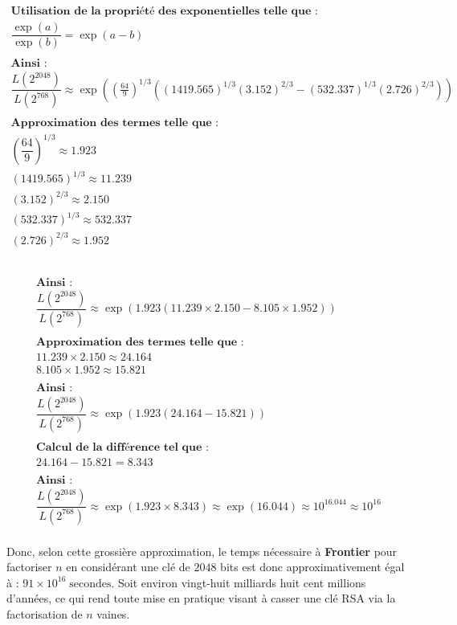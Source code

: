 \documentclass{article}
\begin{document}
\[\begin{array}{l}
	\textbf{Utilisation de la propriété des exponentielles telle que :}\\
	\dfrac{\exp(a)}{\exp(b)} = \exp(a-b) \\ \\
	\textbf{Ainsi :}\\
	\dfrac{L(2^{2048})}{L(2^{768})} \approx \exp\left(\left({\frac{64}{9}}\right)^{1/3} \left(\left(1419.565\right)^{1/3} \left(3.152\right)^{2/3} - \left(532.337\right)^{1/3} \left(2.726\right)^{2/3}\right)\right) \\ \\
	\textbf{Approximation des termes telle que :} \\
	\left(\dfrac{64}{9}\right)^{1/3} \approx 1.923 \\
	\left(1419.565\right)^{1/3} \approx 11.239 \\
	\left(3.152\right)^{2/3} \approx 2.150 \\
	\left(532.337\right)^{1/3} \approx 532.337 \\
	\left(2.726\right)^{2/3} \approx 1.952 \\ \\
	
	\\ \end{array} \] \clearpage

\[ \begin{array}{l}

	
	\textbf{Ainsi :}\\
	\dfrac{L(2^{2048})}{L(2^{768})} \approx \exp\left(1.923\left(11.239 \times 2.150 - 8.105 \times 1.952\right)\right) \\ \\
	\textbf{Approximation des termes telle que :} \\
	11.239 \times 2.150 \approx 24.164 \\
	8.105 \times 1.952 \approx 15.821 \\ \\
	\textbf{Ainsi :}\\
	\dfrac{L(2^{2048})}{L(2^{768})} \approx \exp(1.923(24.164-15.821)) \\ \\
	\textbf{Calcul de la différence tel que :} \\
	24.164-15.821 = 8.343 \\ \\
	\textbf{Ainsi :}\\
	\dfrac{L(2^{2048})}{L(2^{768})} \approx \exp(1.923 \times 8.343) \approx \exp(16.044) \approx 10^{16.044} \approx 10^{16}
\end{array} \] \\
Donc, selon cette grossière approximation, le temps nécessaire à \textbf{Frontier} pour factoriser \(n\) en
considérant une clé de \(2048\) bits est donc approximativement égal à :
\(91 \times 10^{16} \; \text{secondes}\). Soit environ vingt-huit milliards huit cent millions d'années, ce qui rend toute mise en pratique
visant à casser une clé RSA via la factorisation de \(n\) vaines. 
\end{document}
